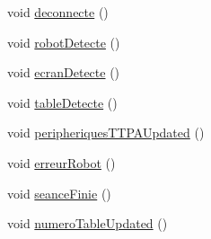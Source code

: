 \begin{DoxyCompactItemize}
void \hyperlink{class_communication_bluetooth_abab4c8889f42c8b818895af96863480e}{deconnecte} ()
\item 
void \hyperlink{class_communication_bluetooth_ad70dc7bbbf69314ae8cd9cc6460a3690}{robot\+Detecte} ()
\item 
void \hyperlink{class_communication_bluetooth_a580660d99ee817b993fc5bd1ec9d973f}{ecran\+Detecte} ()
\item 
void \hyperlink{class_communication_bluetooth_af586bcef345357d838c7ed280df191ea}{table\+Detecte} ()
\item 
void \hyperlink{class_communication_bluetooth_aab8b17e2574afe3ea0ee390a7d63c7a4}{peripheriques\+T\+T\+P\+A\+Updated} ()
\item 
void \hyperlink{class_communication_bluetooth_a74bc2dc753fa3490a2847f3c9497e147}{erreur\+Robot} ()
\item 
void \hyperlink{class_communication_bluetooth_aa35ab06e34cf7571c815f63af91c44a7}{seance\+Finie} ()
\item 
void \hyperlink{class_communication_bluetooth_af17d5f3fa7f55dc02d6f4a6680ec0450}{numero\+Table\+Updated} ()
\end{DoxyCompactItemize}
